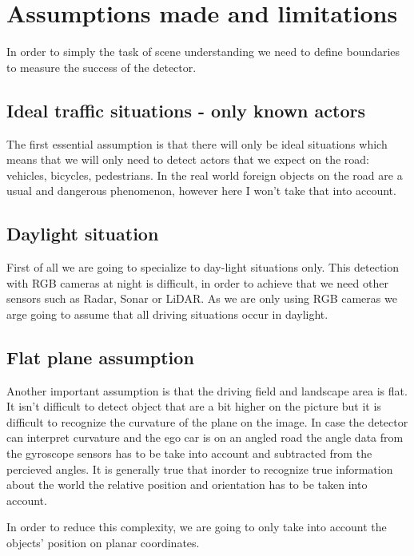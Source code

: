 \chapter{Assumptions made and limitations}
\label{chap:assumptions}

In order to simply the task of scene understanding we need
to define boundaries to measure the success of the detector. 

\section{Ideal traffic situations - only known actors}
The first essential assumption is that there will only be ideal situations which
means that we will only need to detect actors that we expect on the road:
vehicles, bicycles, pedestrians. In the real world foreign objects on the road
are a usual and dangerous phenomenon, however here I won't take that into
account.

\section{Daylight situation}

First of all we are going to specialize to day-light situations only. This
detection with RGB cameras at night is difficult, in order to achieve that we
need other sensors such as Radar, Sonar or LiDAR. As we are only using RGB
cameras we arge going to assume that all driving situations occur in daylight.

\section{Flat plane assumption}
Another important assumption is that the driving field and landscape area is
flat. It isn't difficult to detect object that are a bit higher on the picture
but it is difficult to recognize the curvature of the plane on the image. In
case the detector can interpret curvature and the ego car is on an angled road
the angle data from the gyroscope sensors has to be take into account and
subtracted from the percieved angles. It is generally true that inorder to
recognize true information about the world the relative position and orientation
has to be taken into account.

In order to reduce this complexity,  we are going to only take into account the
objects' position on planar coordinates.

